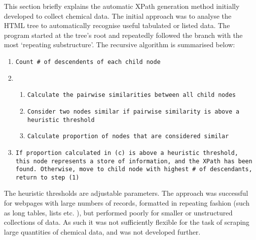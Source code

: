 \label{sec:auto_xpaths}
This section briefly explains the automatic XPath generation method initially developed to collect chemical data.
The initial approach was to analyse the HTML tree to automatically recognise useful tabulated or listed data. The program started at the tree's root and repeatedly followed the branch with the most `repeating substructure'. The recursive algorithm is summarised below:
\begin{sloppypar}
\begin{enumerate}
\item \texttt{Count \# of descendents of each child node}
\item \begin{enumerate}
\item \texttt{Calculate the pairwise similarities between all child nodes}
\item \texttt{Consider  two nodes similar if pairwise similarity is above a heuristic threshold}
\item \texttt{Calculate proportion of nodes that are considered similar}
\end{enumerate}
\item \texttt{If proportion calculated in (c) is above a heuristic threshold, this node represents a store of information, and the XPath has been found. Otherwise, move to child node with highest \# of descendants, return to step (1)}
\end{enumerate}
\end{sloppypar}
The heuristic thresholds are adjustable parameters. The approach was successful for webpages with large numbers of records, formatted in repeating fashion (such as long tables, lists etc. ), but performed poorly for smaller or unstructured collections of data. As such it was not sufficiently flexible for the task of scraping large quantities of chemical data, and was not developed further.